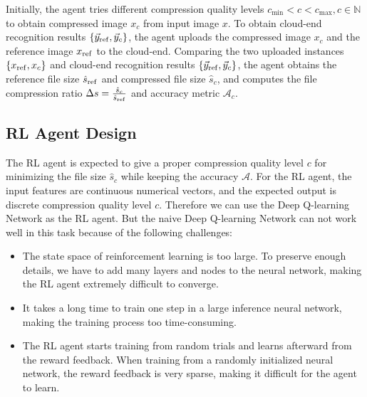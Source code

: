 Initially, the agent tries different compression quality levels $ c_{\min} < c < c_{\max}, c \in \mathbb{N} $ to obtain compressed image $ x_c $ from input image $ x $. To obtain cloud-end recognition results $ \{\vec{y}_{\rm ref}, \vec{y}_c\} $, the agent uploads the compressed image $ x_c $ and the reference image $ x_{\rm ref} $ to the cloud-end. Comparing the two uploaded instances $ \{x_{\rm ref}, x_c\} $ and cloud-end recognition results $ \{\vec{y}_{\rm ref}, \vec{y}_c\} $, the agent obtains the reference file size {\color{revise2}$ \hat{s}_{\rm ref} $} and compressed file size {\color{revise2}$ \hat{s}_c $}, and computes the file compression ratio {\color{revise2}$ \Delta s = \frac{\hat{s}_c}{\hat{s}_{\rm ref}} $} and accuracy metric $ \mathcal{A}_c $.

\subsection{RL Agent Design}

The RL agent is expected to give a proper compression quality level $ c $ for minimizing the file size {\color{revise2}$ \hat{s}_c $} while keeping the accuracy $ \mathcal{A} $. For the RL agent, the input features are continuous numerical vectors, and the expected output is discrete compression quality level $ c $. Therefore we can use the Deep Q-learning Network as the RL agent. But the naive Deep Q-learning Network can not work well in this task because of the following challenges: %

\begin{itemize}
	\item The state space of reinforcement learning is too large. To preserve enough details, we have to add many layers and nodes to the neural network, making the RL agent extremely difficult to converge. 
	\item It takes a long time to train one step in a large inference neural network, making the training process too time-consuming.
	\item The RL agent starts training from random trials and learns afterward from the reward feedback. When training from a randomly initialized neural network, the reward feedback is very sparse, making it difficult for the agent to learn.
\end{itemize}

